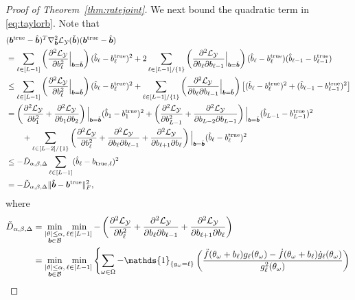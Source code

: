 \documentclass[11pt]{article}
\theoremstyle{plain}
\theoremstyle{definition}
\begin{document}
\begin{proof}[Proof of Theorem~\ref{thm:ratejoint}]
We next bound the quadratic term in \eqref{eq:taylorb}. Note that
\begin{align}\label{eq:quadraticb}
 &(\bm{b}^{\text{true}}-\hat{\bm{b}})^T \nabla^2_{\bm{b}}\mathcal{L}_{\mathcal{Y}}(\check{\bm{b}})(\bm{b}^{\text{true}}-\hat{\bm{b}})\\
 &=\sum_{\ell\in [L-1]} \left( {\partial^2\mathcal{L}_{\mathcal{Y}}\over \partial b^2_\ell} \Big|_{\bm{b}=\check{\bm{b}}} \right)(\hat b_\ell-b^{\text{true}}_{\ell})^2 + 2\sum_{\ell\in[L-1]/\{1\}}\left( {\partial^2\mathcal{L}_{\mathcal{Y}}\over \partial b_\ell \partial b_{\ell-1}} \Big|_{\bm{b}=\check{\bm{b}}} \right)(\hat b_\ell-b^{\text{true}}_{\ell})(\hat b_{\ell-1}-b^{\text{true}}_{\ell-1}) \nonumber \\
&\leq \sum_{\ell\in [L-1]} \left( {\partial^2\mathcal{L}_{\mathcal{Y}}\over \partial b^2_\ell} \Big|_{\bm{b}=\check{\bm{b}}} \right)(\hat b_\ell-b^{\text{true}}_{\ell})^2 + \sum_{\ell\in[L-1]/\{1\}}\left( {\partial^2\mathcal{L}_{\mathcal{Y}}\over \partial b_\ell \partial b_{\ell-1}} \Big|_{\bm{b}=\check{\bm{b}}} \right)\big[(\hat b_\ell-b^{\text{true}}_{\ell})^2 +(\hat b_{\ell-1}-b^{\text{true}}_{\ell-1})^2\big] \nonumber \\
&=\left( {\partial^2\mathcal{L}_{\mathcal{Y}}\over \partial b^2_1}+{\partial^2\mathcal{L}_{\mathcal{Y}}\over \partial b_1 \partial b_2 }\right)\Big|_{\bm{b}=\check{\bm{b}}}(\hat b_1-b^{\text{true}}_{1})^2+\left( {\partial^2\mathcal{L}_{\mathcal{Y}}\over \partial b^2_{L-1}}+{\partial^2\mathcal{L}_{\mathcal{Y}}\over \partial b_{L-2} \partial b_{L-1} }\right)\Big|_{\bm{b}=\check{\bm{b}}}(\hat b_{L-1}-b^{\text{true}}_{L-1})^2  \\
&\quad\quad +\sum_{\ell\in[L-2]/\{1\}}\left( {\partial^2\mathcal{L}_{\mathcal{Y}}\over \partial b^2_\ell}+{\partial^2\mathcal{L}_{\mathcal{Y}}\over \partial b_\ell \partial b_{\ell-1}}+{\partial^2\mathcal{L}_{\mathcal{Y}}\over \partial b_{\ell+1} \partial b_{\ell}} \right)\Big|_{\bm{b}=\check{\bm{b}}} (\hat b_\ell-b^{\text{true}}_{\ell})^2     \\
&\leq - \tilde{D}_{\alpha,\beta,\Delta} \sum_{\ell \in [L-1]}(\hat b_\ell-b_{\text{true},\ell})^2 \nonumber \\
&=-\tilde{D}_{\alpha,\beta,\Delta}\lVert\hat{\bm{b}}-\bm{b}^{\text{true}}\rVert_F^2,
\end{align}
where
\begin{align}
\tilde{D}_{\alpha,\beta,\Delta}&=\min_{\substack{|\theta|\leq \alpha,\\ \mb\in\tB}}\min_{\ell\in[L-1]} -\left( {\partial^2\tL_{\tY}\over \partial b^2_\ell}+{\partial^2\tL_{\tY}\over \partial b_\ell \partial b_{\ell-1}}+{\partial^2\tL_{\tY}\over \partial b_{\ell+1} \partial b_{\ell}} \right)\\
&=\min_{\substack{|\theta|\leq \alpha,\\ \mb\in\tB}} \min_{\ell\in[L-1]}\left\{\sum_{\omega\in\Omega}-\mathds{1}_{\{y_\omega=\ell\}}\left( {\ddot{f}(\theta_\omega+b_{\ell}) g_\ell(\theta_\omega)- \dot{f}(\theta_\omega+b_{\ell})\dot{g}_\ell(\theta_\omega) \over g^2_\ell(\theta_\omega) }\right)\right. \\

\end{align}
\end{proof}
\end{document}

